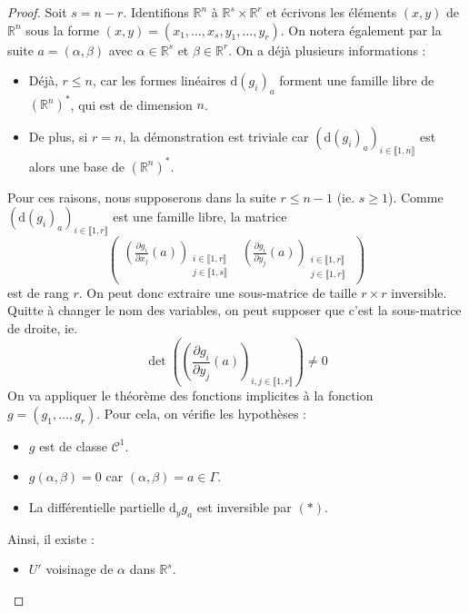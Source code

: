   \begin{proof}
    Soit $s = n-r$. Identifions $\mathbb{R}^n$ à $\mathbb{R}^s \times \mathbb{R}^r$ et écrivons les éléments $(x, y)$ de $\mathbb{R}^n$ sous la forme $(x, y) = (x_1, \dots, x_s, y_1, \dots, y_r)$. On notera également par la suite $a = (\alpha, \beta)$ avec $\alpha \in \mathbb{R}^s$ et $\beta \in \mathbb{R}^r$. On a déjà plusieurs informations :
    \begin{itemize}
      \item Déjà, $r \leq n$, car les formes linéaires $\mathrm{d}(g_i)_a$ forment une famille libre de $(\mathbb{R}^n)^*$, qui est de dimension $n$.
      \item De plus, si $r = n$, la démonstration est triviale car $(\mathrm{d}(g_i)_a)_{i \in \llbracket 1, n \rrbracket}$ est alors une base de $(\mathbb{R}^n)^*$.
    \end{itemize}
    Pour ces raisons, nous supposerons dans la suite $r \leq n-1$ (ie. $s \geq 1$).
    \newpar
    Comme $(\mathrm{d}(g_i)_a)_{i \in \llbracket 1, r \rrbracket}$ est une famille libre, la matrice
    \[ \begin{pmatrix}
      \left( \frac{\partial g_i}{\partial x_j}(a) \right)_{\substack{i \in \llbracket 1, r \rrbracket \\ j \in \llbracket 1, s \rrbracket}} & \left( \frac{\partial g_i}{\partial y_j}(a) \right)_{\substack{i \in \llbracket 1, r \rrbracket \\ j \in \llbracket 1, r \rrbracket}}
    \end{pmatrix} \]
    est de rang $r$. On peut donc extraire une sous-matrice de taille $r \times r$ inversible. Quitte à changer le nom des variables, on peut supposer que c'est la sous-matrice de droite, ie.
    \[ \det \left( \left( \frac{\partial g_i}{\partial y_j}(a) \right)_{i, j \in \llbracket 1, r \rrbracket} \right) \neq 0 \tag{$*$} \]
    On va appliquer le théorème des fonctions implicites à la fonction $g = (g_1, \dots, g_r)$. Pour cela, on vérifie les hypothèses :
    \begin{itemize}
      \item $g$ est de classe $\mathcal{C}^1$.
      \item $g(\alpha, \beta) = 0$ car $(\alpha, \beta) = a \in \Gamma$.
      \item La différentielle partielle $\mathrm{d}_y g_a$ est inversible par $(*)$.
    \end{itemize}
    Ainsi, il existe :
    \begin{itemize}
      \item $U'$ voisinage de $\alpha$ dans $\mathbb{R}^s$.

\end{itemize}
\end{proof}
